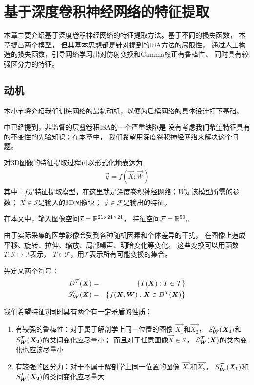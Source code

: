 
\chapter{基于深度卷积神经网络的特征提取\label{chap:CNN}}
本章主要介绍基于深度卷积神经网络的特征提取方法。基于不同的损失函数，
本章提出两个模型，
但其基本思想都是针对提到的ISA方法的局限性，
通过人工构造的损失函数，引导网络学习出对仿射变换和Gamma校正有鲁棒性、
同时具有较强区分力的特征。

\section{动机\label{sec:cnn:motivation}}
本小节将介绍我们训练网络的最初动机，以便为后续网络的具体设计打下基础。

中已经提到，非监督的层叠卷积ISA的一个严重缺陷是
没有考虑我们希望特征具有的不变性的先验知识；在本章中，
我们希望用深度卷积神经网络来解决这个问题。

对3D图像的特征提取过程可以形式化地表达为
\begin{eqnarray}
    \vec{y}=f(\vec{X};\vec{W})
\end{eqnarray}
其中：$f$是特征提取模型，在这里就是深度卷积神经网络；$\vec{W}$是该模型所需的参数；
$\vec{X}\in\mathcal{I}$是输入的3D图像块； $\vec{y}\in\mathcal{F}$是输出的特征。

在本文中，输入图像空间$\mathcal{I}=\mathbb{R}^{21\times 21\times 21}$，
特征空间$\mathcal{F}=\mathbb{R}^{50}$。

由于实际采集的医学影像会受到各种随机因素和个体差异的干扰，
在图像上造成平移、旋转、拉伸、缩放、局部噪声、明暗变化等变化。
这些变换可以用函数$T:\mathcal{I}\mapsto\mathcal{I}$表示，
$T\in\mathcal{T}$，用$\mathcal{T}$表示所有可能变换的集合。

先定义两个符号：
\begin{eqnarray}
    D^{\mathcal{T}}(\boldsymbol{X}) &=& \left\{T(\boldsymbol{X}): T\in\mathcal{T}\right\} \nonumber \\
    S_{\boldsymbol{W}}^{\mathcal{T}}(\boldsymbol{X}) &=& \left\{f(\boldsymbol{X};\boldsymbol{W}):
    \boldsymbol{X}\in D^{\mathcal{T}}(\boldsymbol{X})\right\} \label{eqn:cnn:augdef}
\end{eqnarray}

我们希望特征$\vec{y}$同时具有两个有一定矛盾的性质：
\begin{enumerate}
    \item 有较强的鲁棒性：对于属于解剖学上同一位置的图像
        $\vec{X_1}$和$\vec{X_2}$，
        $S_{\boldsymbol{W}}^{\mathcal{T}}(\boldsymbol{X_1})$和$S_{\boldsymbol{W}}^{\mathcal{T}}(\boldsymbol{X_2})$的类间变化应尽量小；
        而且对于任意图像$\vec{X}\in\mathcal{I}$，
        $S_{\boldsymbol{W}}^{\mathcal{T}}(\boldsymbol{X})$的类内变化也应该尽量小
    \item 有较强的区分力：对于不属于解剖学上同一位置的图像
        $\vec{X_1}$和$\vec{X_2}$，
        $S_{\boldsymbol{W}}^{\mathcal{T}}(\boldsymbol{X_1})$和$S_{\boldsymbol{W}}^{\mathcal{T}}(\boldsymbol{X_2})$的类间变化应尽量大
\end{enumerate}


